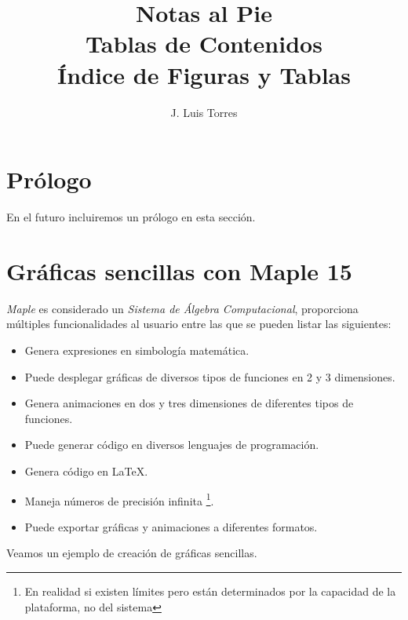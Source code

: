 \documentclass[letterpaper,12pt]{book}
\title{Notas al Pie \\ 
	\vspace{1cm}Tablas de Contenidos \\ 
	\vspace{1cm}Índice de Figuras y Tablas}
\author{J. Luis Torres}
\begin{document}
\maketitle
\frontmatter

\tableofcontents

\listoffigures
{}

\listoftables

\chapter{Prólogo}

En el futuro incluiremos un prólogo en esta sección.

\mainmatter

\chapter{Gráficas sencillas con Maple 15}

\thispagestyle{empty}

\emph{Maple} es considerado un \emph{Sistema de Álgebra Computacional}, proporciona múltiples
funcionalidades al usuario entre las que se pueden listar las siguientes:

\begin{itemize}
	\item Genera expresiones en simbología matemática.
	\item Puede desplegar gráficas de diversos tipos de funciones en 2 y 3 dimensiones.
	\item Genera animaciones en dos y tres dimensiones de diferentes tipos de funciones.
	\item Puede generar código en diversos lenguajes de programación.
	\item Genera código en \LaTeX{}.
	\item Maneja números de precisión infinita \footnote{En realidad si existen límites pero están 
		determinados por la capacidad de la plataforma, no del sistema}.
	\item Puede exportar gráficas y animaciones a diferentes formatos.
\end{itemize}

Veamos un ejemplo de creación de gráficas sencillas.
\end{document}
